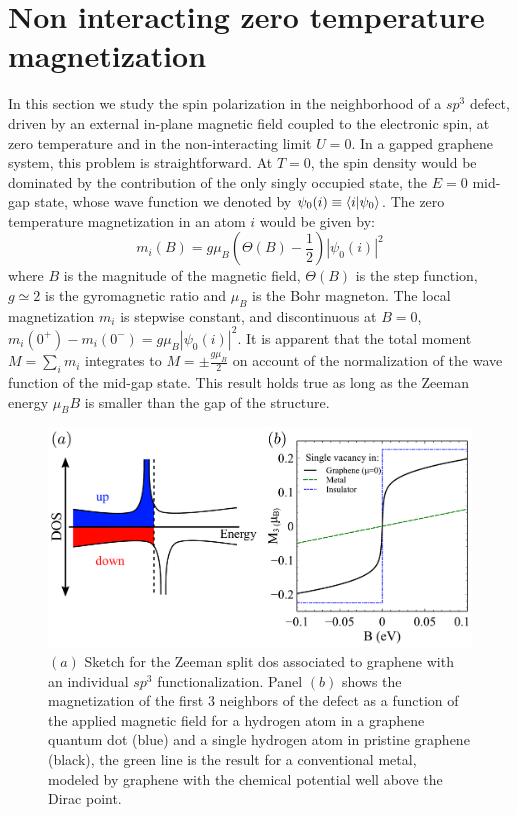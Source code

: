 \section{Non interacting zero temperature magnetization}
\label{sec:Phys}
In this section we study the spin polarization in the neighborhood of a $sp^3$ defect, driven by an external in-plane magnetic field coupled to the electronic spin, at zero temperature and in the non-interacting limit $U=0$.
In a gapped graphene system, this problem is straightforward. At $T=0$, the spin density would be dominated by the contribution of the only singly occupied state, the $E=0$ mid-gap state, whose wave function we denoted by $\psi_0(i)\equiv \langle i|\psi_0\rangle$.
The zero temperature magnetization in an atom $i$ would be given by:
\begin{equation}
m_i(B) = g\mu_B \left(\Theta(B)-\frac{1}{2}\right) |\psi_0(i)|^2
\end{equation}
where $B$ is the magnitude of the magnetic field, $\Theta(B)$ is the step function, $g\simeq2$ is the gyromagnetic ratio and $\mu_B$ is the Bohr magneton. The local magnetization $m_i$ is stepwise constant, and discontinuous at $B=0$, $m_i(0^+)-m_i(0^-)= g\mu_B |\psi_0(i)|^2$.
It is apparent that the total moment $M=\sum_i m_i$ integrates to $M=\pm \frac{g\mu_B}{2}$ on account of the normalization of the wave function of the mid-gap state. This result holds true as long as the Zeeman energy $\mu_B B$  is smaller than the gap of the structure.

\begin{figure}[t!]
  \centering
  \includegraphics{defects/fig/comparison.pdf}
  \caption{$(a)$ Sketch for the Zeeman split \ac{dos} associated to graphene with an individual $sp^3$ functionalization. Panel $(b)$ shows the magnetization of the first 3 neighbors of the defect as a function of the applied magnetic field for a hydrogen atom in a graphene quantum dot (blue) and a single hydrogen atom in pristine graphene (black), the green line is the result for a conventional metal, modeled by graphene with the chemical potential well above the Dirac point.}
  \label{mb}
\end{figure}

